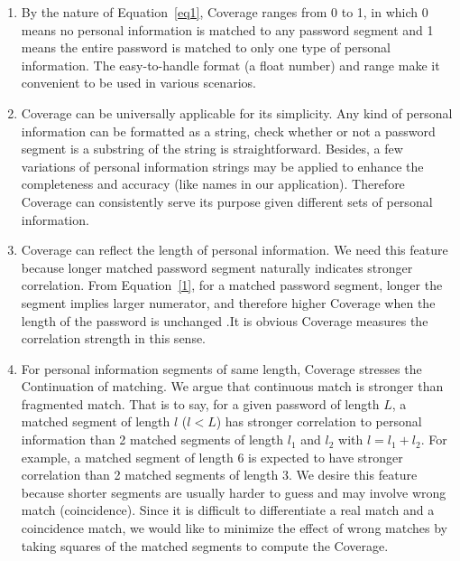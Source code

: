 \begin{enumerate}[leftmargin=*]
\item By the nature of Equation~\ref{eq1}, Coverage ranges from 0 to 1, in which 0 means no personal information is matched to any password segment and 1 means the entire password is matched to only one type of personal information. The easy-to-handle format (a float number) and range make it convenient to be used in various scenarios.
\item Coverage can be universally applicable for its simplicity. Any kind of personal information can be formatted as a string, check whether or not a password segment is a substring of the string is straightforward. Besides, a few variations of personal information strings may be applied to enhance the completeness and accuracy (like names in our application). Therefore Coverage can consistently serve its purpose given different sets of personal information.
\item Coverage can reflect the length of personal information. We need this feature because longer matched password segment naturally indicates stronger correlation. From Equation~\ref{1}, for a matched password segment, longer the segment implies larger numerator, and therefore higher Coverage when the length of the password is unchanged .It is obvious Coverage measures the correlation strength in this sense. 
\item For personal information segments of same length, Coverage stresses the Continuation of matching. We argue that continuous match is stronger than fragmented match. That is to say, for a given password of length $L$, a matched segment of length $l$ ($l<L$) has stronger correlation to personal information than 2 matched segments of length $l_1$ and $l_2$ with $l = l_1 + l_2$. For example, a matched segment of length 6 is expected to have stronger correlation than 2 matched segments of length 3. We desire this feature because shorter segments are usually harder to guess and may involve wrong match (coincidence). Since it is difficult to differentiate a real match and a coincidence match, we would like to minimize the effect of wrong matches by taking squares of the matched segments to compute the Coverage.
\end{enumerate}

